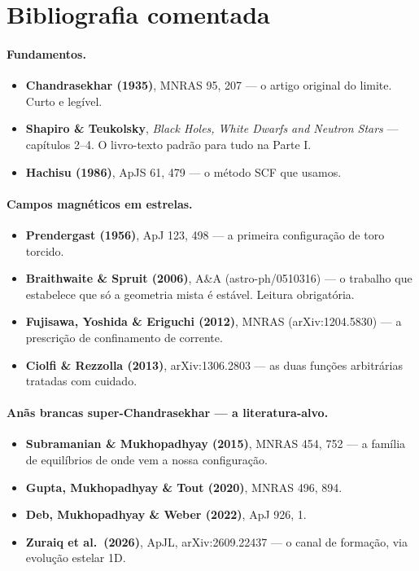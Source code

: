 \documentclass[11pt,a4paper]{article}
\begin{document}
\section*{Bibliografia comentada}

\paragraph{Fundamentos.}
\begin{itemize}[leftmargin=1.2em]
\item \textbf{Chandrasekhar (1935)}, MNRAS 95, 207 --- o artigo original do
      limite. Curto e legível.
\item \textbf{Shapiro \& Teukolsky}, \emph{Black Holes, White Dwarfs and
      Neutron Stars} --- capítulos 2--4. O livro-texto padrão para tudo na
      Parte I.
\item \textbf{Hachisu (1986)}, ApJS 61, 479 --- o método SCF que usamos.
\end{itemize}

\paragraph{Campos magnéticos em estrelas.}
\begin{itemize}[leftmargin=1.2em]
\item \textbf{Prendergast (1956)}, ApJ 123, 498 --- a primeira configuração de
      toro torcido.
\item \textbf{Braithwaite \& Spruit (2006)}, A\&A (astro-ph/0510316) --- o
      trabalho que estabelece que só a geometria mista é estável. Leitura
      obrigatória.
\item \textbf{Fujisawa, Yoshida \& Eriguchi (2012)}, MNRAS
      (arXiv:1204.5830) --- a prescrição de confinamento de corrente.
\item \textbf{Ciolfi \& Rezzolla (2013)}, arXiv:1306.2803 --- as duas funções
      arbitrárias tratadas com cuidado.
\end{itemize}

\paragraph{Anãs brancas super-Chandrasekhar --- a literatura-alvo.}
\begin{itemize}[leftmargin=1.2em]
\item \textbf{Subramanian \& Mukhopadhyay (2015)}, MNRAS 454, 752 --- a
      família de equilíbrios de onde vem a nossa configuração.
\item \textbf{Gupta, Mukhopadhyay \& Tout (2020)}, MNRAS 496, 894.
\item \textbf{Deb, Mukhopadhyay \& Weber (2022)}, ApJ 926, 1.
\item \textbf{Zuraiq et al.\ (2026)}, ApJL, arXiv:2609.22437 --- o canal de
      formação, via evolução estelar 1D.
\end{itemize}
\end{document}

